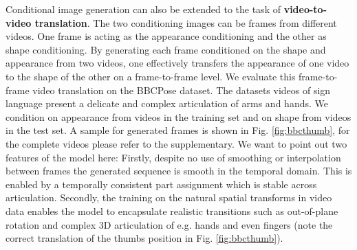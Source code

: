 	Conditional image generation can also be extended to the task of \textbf{video-to-video translation}. The two conditioning images can be frames from different videos. One frame is acting as the appearance conditioning and the other as shape conditioning. By generating each frame conditioned on the shape and appearance from two videos, one effectively transfers the appearance of one video to the shape of the other on a frame-to-frame level.
	We evaluate this frame-to-frame video translation on the BBCPose dataset. The datasets videos of sign language present a delicate and complex articulation of arms and hands. We condition on appearance from videos in the training set and on shape from videos in the test set. A sample for generated frames is shown in Fig. \ref{fig:bbcthumb}, for the complete videos please refer to the supplementary.
	We want to point out two features of the model here: Firstly, despite no use of smoothing or interpolation between frames the generated sequence is smooth in the temporal domain. This is enabled by a temporally consistent part assignment which is stable across articulation.
	Secondly, the training on the natural spatial transforms in video data enables the model to encapsulate realistic transitions such as out-of-plane rotation and complex 3D articulation of e.g. hands and even fingers (note the correct translation of the thumbs position in Fig. \ref{fig:bbcthumb}). \\

